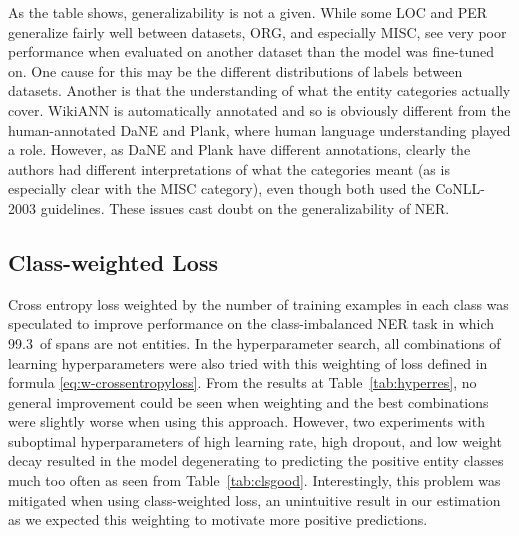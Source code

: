\documentclass[main.tex]{subfiles}
\begin{document}
As the table shows, generalizability is not a given.
While some LOC and PER generalize fairly well between datasets, ORG, and especially MISC, see very poor performance when evaluated on another dataset than the model was fine-tuned on.
One cause for this may be the different distributions of labels between datasets.
Another is that the understanding of what the entity categories actually cover.
WikiANN is automatically annotated and so is obviously different from the human-annotated DaNE and Plank, where human language understanding played a role.
However, as DaNE and Plank have different annotations, clearly the authors had different interpretations of what the categories meant (as is especially clear with the MISC category), even though both used the CoNLL-2003 guidelines.
These issues cast doubt on the generalizability of NER.
\cite{hvingelby2020dane, plank2019neural, pan2017wikiann, tjang2003conll}

\subsection{Class-weighted Loss}
\label{subsec:lossexp}
Cross entropy loss weighted by the number of training examples in each class was speculated to improve performance on the class-imbalanced NER task in which 99.3\pro\ of spans are not entities.
In the hyperparameter search, all combinations of learning hyperparameters were also tried with this weighting of loss defined in formula \eqref{eq:w-crossentropyloss}.
From the results at Table~\ref{tab:hyperres}, no general improvement could be seen when weighting and the best combinations were slightly worse when using this approach.
However, two experiments with suboptimal hyperparameters of high learning rate, high dropout, and low weight decay resulted in the model degenerating to predicting the positive entity classes much too often as seen from Table~\ref{tab:clsgood}.
Interestingly, this problem was mitigated when using class-weighted loss, an unintuitive result in our estimation as we expected this weighting to motivate more positive predictions.
\end{document}
